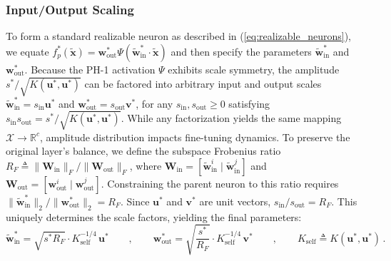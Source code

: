 \documentclass[11pt, a4paper, copyright, gdm]{google}
\newcommand{\normshort}[1]{\lVert#1\rVert}
\newcommand{\uVect}{\boldsymbol{u}}
\newcommand{\vVect}{\boldsymbol{v}}
\newcommand{\wVect}{\boldsymbol{w}}
\newcommand{\xVect}{\boldsymbol{x}}
\newcommand{\calX}{\mathcal{X}}
\newcommand{\R}{\mathbb{R}}
\newcommand{\Wmat}{\boldsymbol{W}}
\theoremstyle{definition}
\begin{document}
\subsubsection{Input/Output Scaling}
To form a standard realizable neuron as described in (\ref{eq:realizable_neurons}), we equate $f_p^*(\tilde{\xVect}) = \wVect_{\text{out}}^* \Psi(\tilde{\wVect}_{\text{in}}^* \cdot \tilde{\xVect})$ and then specify the parameters $\tilde{\wVect}^*_{\text{in}}$ and $\wVect_{\text{out}}^*$. Because the PH-1 activation $\Psi$ exhibits scale symmetry, the amplitude $s^* / \sqrt{K(\uVect^*,\uVect^*)}$ can be factored into arbitrary input and output scales $\tilde{\wVect}_{\text{in}}^* = s_\text{in} \uVect^*$ and $\wVect_{\text{out}}^* = s_\text{out} \vVect^*$, for any $s_\text{in},s_\text{out} \geq 0$ satisfying $s_\text{in} s_\text{out} = s^* / \sqrt{K(\uVect^*,\uVect^*)}$. While any factorization yields the same mapping $\calX \rightarrow \R^c$, amplitude distribution impacts fine-tuning dynamics. To preserve the original layer's balance, we define the subspace Frobenius ratio $R_F \triangleq \normshort{\Wmat_{\text{in}}}_F / \normshort{\Wmat_{\text{out}}}_F$, where $\Wmat_{\text{in}} = [\tilde{\wVect}^i_{\text{in}} \mid \tilde{\wVect}^j_{\text{in}}]$ and $\Wmat_{\text{out}} = [\wVect^i_{\text{out}} \mid \wVect^j_{\text{out}}]$. Constraining the parent neuron to this ratio requires $\normshort{\tilde{\wVect}^*_{\text{in}}}_2 / \normshort{\wVect^*_{\text{out}}}_2 = R_F$. Since $\uVect^*$ and $\vVect^*$ are unit vectors, $s_\text{in} / s_\text{out} = R_F$. This uniquely determines the scale factors, yielding the final parameters:
\begin{equation}
\tilde{\wVect}_{\text{in}}^* = \sqrt{s^* R_F} \cdot K_\text{self}^{-1/4}\, \uVect^* \qquad,\qquad \wVect_{\text{out}}^* = \sqrt{\frac{s^*}{R_F}} \cdot K_\text{self}^{-1/4} \, \vVect^* \qquad,\qquad K_\text{self} \triangleq K(\uVect^*,\uVect^*) \,.
\end{equation}
\end{document}

